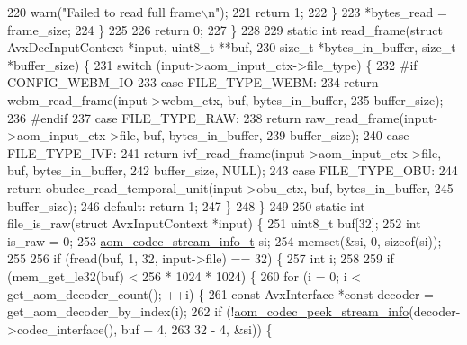 \begin{DoxyCodeInclude}
{{{{{{{220       warn(\textcolor{stringliteral}{"Failed to read full frame\(\backslash\)n"});
221       \textcolor{keywordflow}{return} 1;
222     \}
223     *bytes\_read = frame\_size;
224   \}
225 
226   \textcolor{keywordflow}{return} 0;
227 \}
228 
229 \textcolor{keyword}{static} \textcolor{keywordtype}{int} read\_frame(\textcolor{keyword}{struct} AvxDecInputContext *input, uint8\_t **buf,
230                       \textcolor{keywordtype}{size\_t} *bytes\_in\_buffer, \textcolor{keywordtype}{size\_t} *buffer\_size) \{
231   \textcolor{keywordflow}{switch} (input->aom\_input\_ctx->file\_type) \{
232 \textcolor{preprocessor}{#if CONFIG\_WEBM\_IO}
233     \textcolor{keywordflow}{case} FILE\_TYPE\_WEBM:
234       \textcolor{keywordflow}{return} webm\_read\_frame(input->webm\_ctx, buf, bytes\_in\_buffer,
235                              buffer\_size);
236 \textcolor{preprocessor}{#endif}
237     \textcolor{keywordflow}{case} FILE\_TYPE\_RAW:
238       \textcolor{keywordflow}{return} raw\_read\_frame(input->aom\_input\_ctx->file, buf, bytes\_in\_buffer,
239                             buffer\_size);
240     \textcolor{keywordflow}{case} FILE\_TYPE\_IVF:
241       \textcolor{keywordflow}{return} ivf\_read\_frame(input->aom\_input\_ctx->file, buf, bytes\_in\_buffer,
242                             buffer\_size, NULL);
243     \textcolor{keywordflow}{case} FILE\_TYPE\_OBU:
244       \textcolor{keywordflow}{return} obudec\_read\_temporal\_unit(input->obu\_ctx, buf, bytes\_in\_buffer,
245                                        buffer\_size);
246     \textcolor{keywordflow}{default}: \textcolor{keywordflow}{return} 1;
247   \}
248 \}
249 
250 \textcolor{keyword}{static} \textcolor{keywordtype}{int} file\_is\_raw(\textcolor{keyword}{struct} AvxInputContext *input) \{
251   uint8\_t buf[32];
252   \textcolor{keywordtype}{int} is\_raw = 0;
253   \hyperlink{structaom__codec__stream__info}{aom\_codec\_stream\_info\_t} si;
254   memset(&si, 0, \textcolor{keyword}{sizeof}(si));
255 
256   \textcolor{keywordflow}{if} (fread(buf, 1, 32, input->file) == 32) \{
257     \textcolor{keywordtype}{int} i;
258 
259     \textcolor{keywordflow}{if} (mem\_get\_le32(buf) < 256 * 1024 * 1024) \{
260       \textcolor{keywordflow}{for} (i = 0; i < get\_aom\_decoder\_count(); ++i) \{
261         \textcolor{keyword}{const} AvxInterface *\textcolor{keyword}{const} decoder = get\_aom\_decoder\_by\_index(i);
262         \textcolor{keywordflow}{if} (!\hyperlink{group__decoder_ga2544bac9fdc439f0effd6b1b14df54be}{aom\_codec\_peek\_stream\_info}(decoder->codec\_interface(), buf + 4,
263                                         32 - 4, &si)) \{
}}}}}}}
\end{DoxyCodeInclude}
